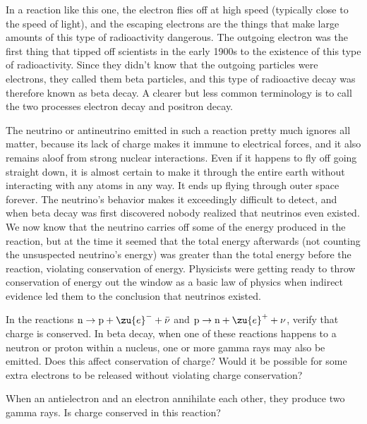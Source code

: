         In a reaction like this one, the electron flies off at high
        speed (typically close to the speed of light), and the
        escaping electrons are the things that make large amounts of
        this type of radioactivity dangerous. The outgoing electron
        was the first thing that tipped off scientists in the early
        1900s to the existence of this type of radioactivity.
        Since they didn't know that the outgoing particles were
        electrons, they called them beta particles, and this type of
        radioactive decay was therefore known as beta decay. A
        clearer but less common terminology is to call the two
        processes electron decay and positron decay.

        The neutrino or antineutrino emitted 
        in such a reaction pretty much ignores all matter, because its
        lack of charge makes it immune to electrical forces, and it
        also remains aloof from strong nuclear interactions. Even if
        it happens to fly off going straight down, it is almost
        certain to make it through the entire earth without
        interacting with any atoms in any way. It ends up flying
        through outer space forever. The neutrino's behavior makes
        it exceedingly difficult to detect, and when beta decay was
        first discovered nobody realized that neutrinos even
        existed. We now know that the neutrino carries off some of
        the energy produced in the reaction, but at the time it
        seemed that the total energy afterwards (not counting the
        unsuspected neutrino's energy) was greater than the total
        energy before the reaction, violating conservation of
        energy. Physicists were getting ready to throw conservation
        of energy out the window as a basic law of physics when
        indirect evidence led them to the conclusion that neutrinos existed.

\startdqs

\begin{dq}
        In the reactions 
                $\text{n} \rightarrow \text{p} + \zu{e}^- +  \bar{\nu}$
        and
                $\text{p} \rightarrow \text{n} + \zu{e}^+ + \nu$,
        verify that charge is conserved. In beta
        decay, when one of these reactions happens to a neutron or
        proton within a nucleus, one or more gamma rays may also be
        emitted. Does this affect conservation of charge? Would it
        be possible for some extra electrons to be released without
        violating charge conservation?
\end{dq}
\begin{dq}
        When an antielectron and an electron annihilate each
        other, they produce two gamma rays. Is charge conserved in this reaction?
\end{dq}


